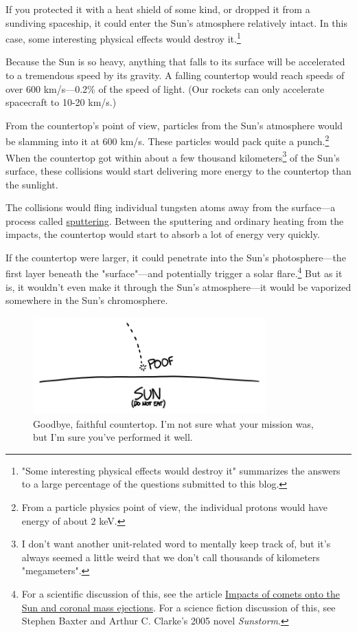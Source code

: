 {{If you protected it with a heat shield of some kind, or dropped it from a sundiving spaceship, it could enter the Sun's atmosphere relatively intact. In this case, some interesting physical effects would destroy it.{\footnote{"Some interesting physical effects would destroy it" summarizes the answers to a large percentage of the questions submitted to this blog.} } }

{Because the Sun is so heavy, anything that falls to its surface will be accelerated to a tremendous speed by its gravity. A falling countertop would reach speeds of over 600 km/s—0.2\% of the speed of light. (Our rockets can only accelerate spacecraft to 10-20 km/s.)}

{From the countertop's point of view, particles from the Sun's atmosphere would be slamming into it at 600 km/s. These particles would pack quite a punch.{\footnote{From a particle physics point of view, the individual protons would have energy of about 2 keV.} } When the countertop got within about a few thousand kilometers{\footnote{I don't want another unit-related word to mentally keep track of, but it's always seemed a little weird that we don't call thousands of kilometers "megameters".} } of the Sun's surface, these collisions would start delivering more energy to the countertop than the sunlight.}

{The collisions would fling individual tungsten atoms away from the surface—a process called \href{https://en.wikipedia.org/wiki/Sputtering}{sputtering}. Between the sputtering and ordinary heating from the impacts, the countertop would start to absorb a lot of energy very quickly.}

{If the countertop were larger, it could penetrate into the Sun's photosphere—the first layer beneath the "surface"—and potentially trigger a solar flare.{\footnote{For a scientific discussion of this, see the article \href{http://meetings.copernicus.org/www.cosis.net/abstracts/EGU05/04384/EGU05-J-04384.pdf}{Impacts of comets onto the Sun and coronal mass ejections}. For a science fiction discussion of this, see Stephen Baxter and Arthur C. Clarke's 2005 novel \emph{Sunstorm}.} } But as it is, it wouldn't even make it through the Sun's atmosphere—it would be vaporized somewhere in the Sun's chromosphere.}

\begin{figure}[!htbp]
\centering
\includegraphics[scale=0.5, max width=0.8\textwidth]{imgs/a/89/sun_bye.png}
\caption{Goodbye, faithful countertop. I'm not sure what your mission was, but I'm sure you've performed it well.}
\end{figure}

}
